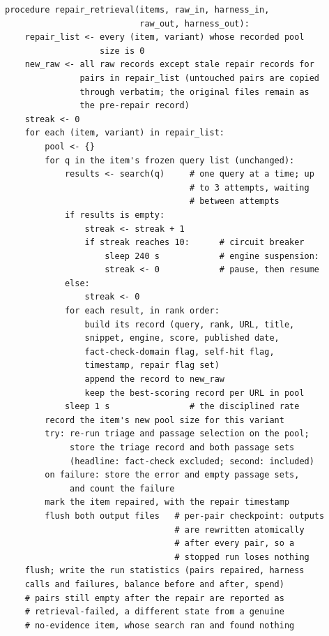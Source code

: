 \documentclass{article} %
\begin{document}
{\footnotesize\begin{verbatim}
procedure repair_retrieval(items, raw_in, harness_in,
                           raw_out, harness_out):
    repair_list <- every (item, variant) whose recorded pool
                   size is 0
    new_raw <- all raw records except stale repair records for
               pairs in repair_list (untouched pairs are copied
               through verbatim; the original files remain as
               the pre-repair record)
    streak <- 0
    for each (item, variant) in repair_list:
        pool <- {}
        for q in the item's frozen query list (unchanged):
            results <- search(q)     # one query at a time; up
                                     # to 3 attempts, waiting
                                     # between attempts
            if results is empty:
                streak <- streak + 1
                if streak reaches 10:      # circuit breaker
                    sleep 240 s            # engine suspension:
                    streak <- 0            # pause, then resume
            else:
                streak <- 0
            for each result, in rank order:
                build its record (query, rank, URL, title,
                snippet, engine, score, published date,
                fact-check-domain flag, self-hit flag,
                timestamp, repair flag set)
                append the record to new_raw
                keep the best-scoring record per URL in pool
            sleep 1 s                # the disciplined rate
        record the item's new pool size for this variant
        try: re-run triage and passage selection on the pool;
             store the triage record and both passage sets
             (headline: fact-check excluded; second: included)
        on failure: store the error and empty passage sets,
             and count the failure
        mark the item repaired, with the repair timestamp
        flush both output files   # per-pair checkpoint: outputs
                                  # are rewritten atomically
                                  # after every pair, so a
                                  # stopped run loses nothing
    flush; write the run statistics (pairs repaired, harness
    calls and failures, balance before and after, spend)
    # pairs still empty after the repair are reported as
    # retrieval-failed, a different state from a genuine
    # no-evidence item, whose search ran and found nothing
\end{verbatim}}

\end{document}
